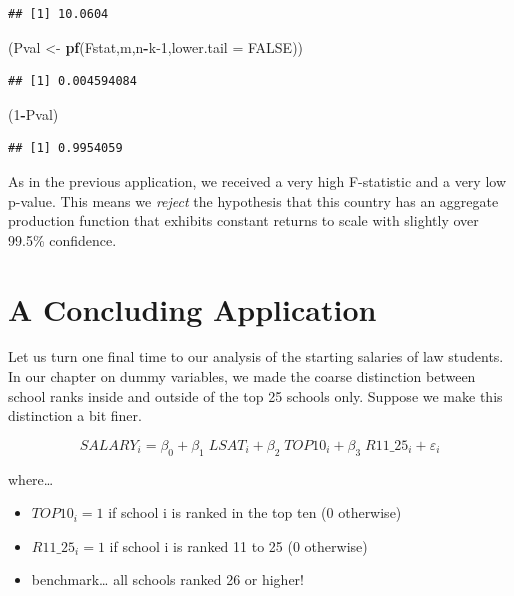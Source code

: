\documentclass[
]{book}
\newenvironment{Shaded}{\begin{snugshade}}{\end{snugshade}}
\newcommand{\AttributeTok}[1]{\textcolor[rgb]{0.13,0.29,0.53}{#1}}
\newcommand{\ConstantTok}[1]{\textcolor[rgb]{0.56,0.35,0.01}{#1}}
\newcommand{\DecValTok}[1]{\textcolor[rgb]{0.00,0.00,0.81}{#1}}
\newcommand{\FunctionTok}[1]{\textcolor[rgb]{0.13,0.29,0.53}{\textbf{#1}}}
\newcommand{\NormalTok}[1]{#1}
\newcommand{\OtherTok}[1]{\textcolor[rgb]{0.56,0.35,0.01}{#1}}
\newcommand{\SpecialCharTok}[1]{\textcolor[rgb]{0.81,0.36,0.00}{\textbf{#1}}}
\begin{document}
\begin{verbatim}
## [1] 10.0604
\end{verbatim}

\begin{Shaded}
\begin{Highlighting}[]
\NormalTok{(Pval }\OtherTok{\textless{}{-}} \FunctionTok{pf}\NormalTok{(Fstat,m,n}\SpecialCharTok{{-}}\NormalTok{k}\DecValTok{{-}1}\NormalTok{,}\AttributeTok{lower.tail =} \ConstantTok{FALSE}\NormalTok{))}
\end{Highlighting}
\end{Shaded}

\begin{verbatim}
## [1] 0.004594084
\end{verbatim}

\begin{Shaded}
\begin{Highlighting}[]
\NormalTok{(}\DecValTok{1}\SpecialCharTok{{-}}\NormalTok{Pval)}
\end{Highlighting}
\end{Shaded}

\begin{verbatim}
## [1] 0.9954059
\end{verbatim}

As in the previous application, we received a very high F-statistic and a very low p-value. This means we \emph{reject} the hypothesis that this country has an aggregate production function that exhibits constant returns to scale with slightly over 99.5\% confidence.

\section{A Concluding Application}\label{a-concluding-application-5}

Let us turn one final time to our analysis of the starting salaries of law students. In our chapter on dummy variables, we made the coarse distinction between school ranks inside and outside of the top 25 schools only. Suppose we make this distinction a bit finer.

\[SALARY_i = \beta_0 + \beta_1 \; LSAT_i + \beta_2 \; TOP10_i + \beta_3 \; R11\_25_i + \varepsilon_i\]

where\ldots{}

\begin{itemize}
\item
  \(TOP10_i = 1\) if school i is ranked in the top ten (0 otherwise)
\item
  \(R11\_25_i = 1\) if school i is ranked 11 to 25 (0 otherwise)
\item
  benchmark\ldots{} all schools ranked 26 or higher!
\end{itemize}
\end{document}
